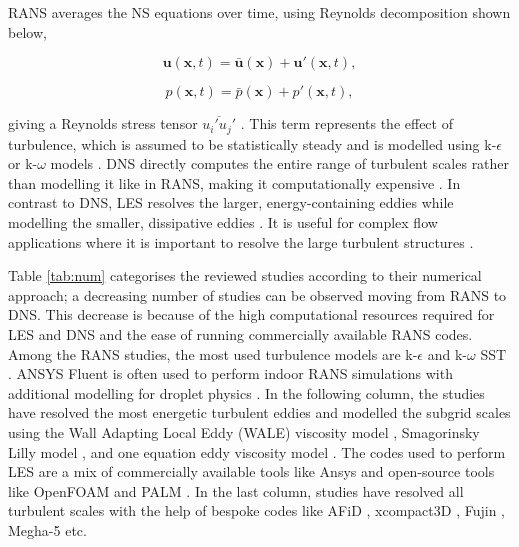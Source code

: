 \documentclass[a4paper,12pt]{elsarticle}
\begin{document}
RANS averages the NS equations over time, using Reynolds decomposition shown below,

\begin{equation}
    \textbf{u}(\textbf{x},t) = \bar{\textbf{u}}(\textbf{x}) + \textbf{u}'(\textbf{x},t),
\label{eq:1}
\end{equation}

\begin{equation}
    p(\textbf{x},t) = \bar{p}(\textbf{x}) + p'(\textbf{x},t),
\label{eq:2}
\end{equation}

giving a Reynolds stress tensor $\overline{u_i'u_j'}$ \cite{wilcox2006turbulence}. This term represents the effect of turbulence, which is assumed to be statistically steady and is modelled using k-$\epsilon$ or k-$\omega$ models \cite{pope2000turbulent}. DNS directly computes the entire range of turbulent scales rather than modelling it like in RANS, making it computationally expensive \cite{moin2011dns}. In contrast to DNS, LES resolves the larger, energy-containing eddies while modelling the smaller, dissipative eddies \cite{sagaut2006large}. It is useful for complex flow applications where it is important to resolve the large turbulent structures \cite{smagorinsky1963general}.

Table \ref{tab:num} categorises the reviewed studies according to their numerical approach; a decreasing number of studies can be observed moving from RANS to DNS. This decrease is because of the high computational resources required for LES and DNS and the ease of running commercially available RANS codes. Among the RANS studies, the most used turbulence models are k-$\epsilon$ \cite{ren2021numerical,ou2022insufficient} and k-$\omega$ SST \cite{dbouk2020coughing,yan2021transmission}. ANSYS Fluent is often used to perform indoor RANS simulations with additional modelling for droplet physics \cite{li2020investigating,wei2023effects}. In the following column, the studies have resolved the most energetic turbulent eddies and modelled the subgrid scales using the Wall Adapting Local Eddy (WALE) viscosity model \cite{feng2020study,zhang2019distribution}, Smagorinsky Lilly model \cite{wu2023numerical,li2022airborne}, and one equation eddy viscosity model \cite{pendar2020numerical}. The codes used to perform LES are a mix of commercially available tools like Ansys \cite{saarinen2015large,feng2020study} and open-source tools like OpenFOAM and PALM \cite{vuorinen2020modelling}. In the last column, studies have resolved all turbulent scales with the help of bespoke codes like AFiD \cite{chong2021extended}, xcompact3D \cite{giri2022colliding}, Fujin \cite{rosti2020fluid}, Megha-5 \cite{singhal2022virus} etc.
\end{document}
